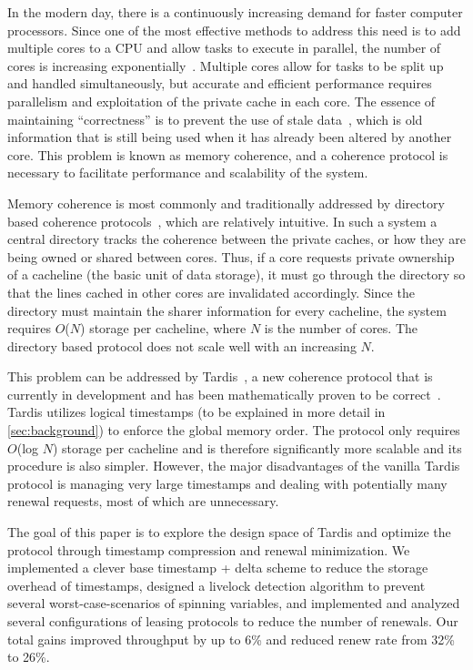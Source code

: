 \documentclass[12pt]{article}
\begin{document}
	
	In the modern day, there is a continuously increasing demand for 
	faster computer processors. Since one of the most effective methods to 
	address this need is to add multiple cores to a CPU and allow tasks to 
	execute in parallel, the number of cores is increasing 
	exponentially~\cite{tilera, xeonphi}. 
	Multiple cores allow for tasks to be split up and handled 
	simultaneously, but accurate and efficient performance requires 
	parallelism and exploitation of the private cache in each core.  The 
	essence of maintaining ``correctness'' is to prevent the use of stale 
	data~\cite{lamport1978}, which is old information that is still being used 
	when it has already been altered by another core. This problem is 
	known as memory coherence, and a coherence protocol is necessary to 
	facilitate performance and scalability of the system.
	
	Memory coherence is most commonly and traditionally addressed by 
	directory based coherence protocols~\cite{censier1978, tang1976}, 
	which are relatively intuitive. In such a system a central directory
	tracks the coherence between the private caches, or how they are being
	owned or shared between cores. Thus, if a core requests private
	ownership of a cacheline (the basic unit of data storage), it must
	go through the directory so that the lines cached in other cores are 
	invalidated accordingly. Since the directory must maintain the sharer 
	information for every cacheline, the system requires $O$($N$) storage per 
	cacheline, where $N$ is the number of cores.  The directory based 
	protocol does not scale well with an increasing $N$.
	
	This problem can be addressed by Tardis~\cite{tardis}, a new coherence 
	protocol that is currently in development and has been mathematically 
	proven to be correct~\cite{tardis-proof}. Tardis utilizes logical 
	timestamps (to be explained in more detail in \cref{sec:background}) to enforce 
	the global memory order. The protocol only requires $O$(log $N$) storage 
	per cacheline and is therefore significantly more scalable and its procedure is also simpler. However, the major disadvantages of the vanilla Tardis 
	protocol is managing very large timestamps and dealing with 
	potentially many renewal requests, most of which are unnecessary. 
	
	The goal of this paper is to explore the design space of Tardis and 
	optimize the protocol through timestamp compression and renewal 
	minimization. We implemented a clever base timestamp + delta scheme to 
	reduce the storage overhead of timestamps, designed a livelock 
	detection algorithm to prevent several worst-case-scenarios of 
	spinning variables, and implemented and analyzed several 
	configurations of leasing protocols to reduce the number of renewals. Our total gains improved throughput by up to 6\% and reduced renew rate from 32\% to 26\%.
	
\end{document}
